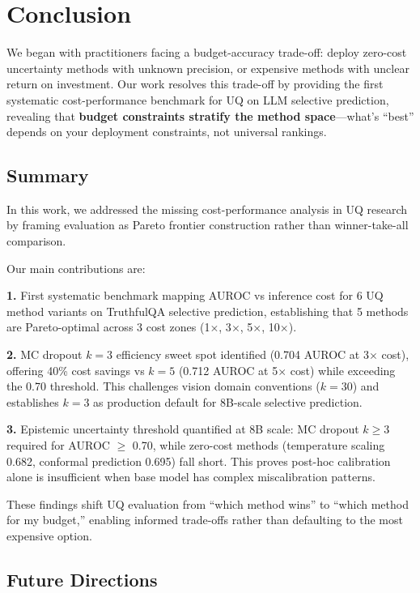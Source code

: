 \section{Conclusion}

We began with practitioners facing a budget-accuracy trade-off: deploy zero-cost uncertainty methods with unknown precision, or expensive methods with unclear return on investment. Our work resolves this trade-off by providing the first systematic cost-performance benchmark for UQ on LLM selective prediction, revealing that \textbf{budget constraints stratify the method space}---what's ``best'' depends on your deployment constraints, not universal rankings.

\subsection{Summary}

In this work, we addressed the missing cost-performance analysis in UQ research by framing evaluation as Pareto frontier construction rather than winner-take-all comparison.

Our main contributions are:

\textbf{1.} First systematic benchmark mapping AUROC vs inference cost for 6 UQ method variants on TruthfulQA selective prediction, establishing that 5 methods are Pareto-optimal across 3 cost zones (1$\times$, 3$\times$, 5$\times$, 10$\times$).

\textbf{2.} MC dropout $k=3$ efficiency sweet spot identified (0.704 AUROC at 3$\times$ cost), offering 40\% cost savings vs $k=5$ (0.712 AUROC at 5$\times$ cost) while exceeding the 0.70 threshold. This challenges vision domain conventions ($k=30$) and establishes $k=3$ as production default for 8B-scale selective prediction.

\textbf{3.} Epistemic uncertainty threshold quantified at 8B scale: MC dropout $k\geq3$ required for AUROC $\geq$ 0.70, while zero-cost methods (temperature scaling 0.682, conformal prediction 0.695) fall short. This proves post-hoc calibration alone is insufficient when base model has complex miscalibration patterns.

These findings shift UQ evaluation from ``which method wins'' to ``which method for my budget,'' enabling informed trade-offs rather than defaulting to the most expensive option.

\subsection{Future Directions}

